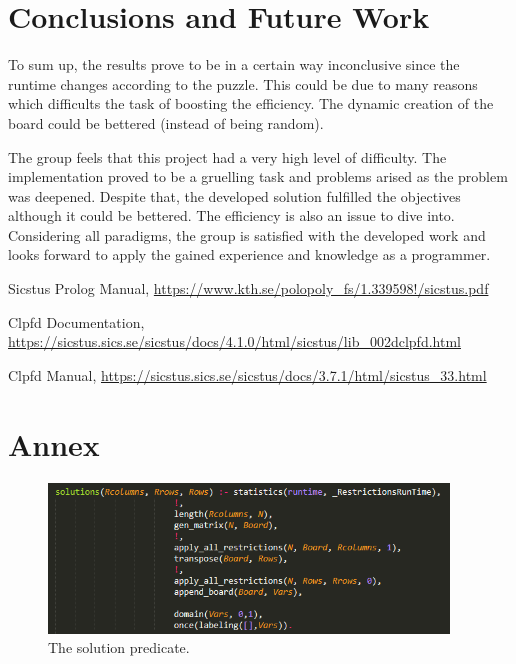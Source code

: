 \documentclass[runningheads,a4paper]{llncs}
\begin{document}
\newpage
\section{Conclusions and Future Work}
	
	To sum up, the results prove to be in a certain way inconclusive since the runtime changes according to the puzzle. This could be due to many reasons which difficults the task of boosting the efficiency. The dynamic creation of the board could be bettered (instead of being random).
	\par The group feels that this project had a very high level of difficulty. The implementation proved to be a gruelling task and problems arised as the problem was deepened. Despite that, the developed solution fulfilled the objectives although it could be bettered. The efficiency is also an issue to dive into. Considering all paradigms, the group is satisfied with the developed work and looks forward to apply the gained experience and knowledge as a programmer.

\begin{thebibliography}{2}

 Sicstus Prolog Manual, \url{https://www.kth.se/polopoly_fs/1.339598!/sicstus.pdf}

 Clpfd Documentation, \url{https://sicstus.sics.se/sicstus/docs/4.1.0/html/sicstus/lib_002dclpfd.html}

 Clpfd Manual, \url{https://sicstus.sics.se/sicstus/docs/3.7.1/html/sicstus_33.html}

\end{thebibliography}


\section{Annex}

	\begin{figure}[h!]
	\centering
	\includegraphics[height=4.0cm]{solutions.png}
	\caption{The solution predicate.}
	\label{solutionsPred}
	\end{figure}
\end{document}
